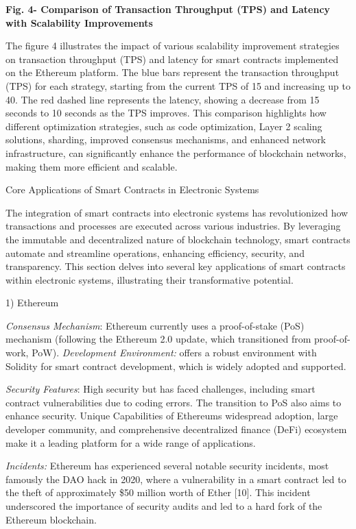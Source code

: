 \textbf{Fig. 4- Comparison of Transaction Throughput (TPS) and Latency
with Scalability Improvements}

The figure 4 illustrates the impact of various scalability improvement
strategies on transaction throughput (TPS) and latency for smart
contracts implemented on the Ethereum platform. The blue bars represent
the transaction throughput (TPS) for each strategy, starting from the
current TPS of 15 and increasing up to 40. The red dashed line
represents the latency, showing a decrease from 15 seconds to 10 seconds
as the TPS improves. This comparison highlights how different
optimization strategies, such as code optimization, Layer 2 scaling
solutions, sharding, improved consensus mechanisms, and enhanced network
infrastructure, can significantly enhance the performance of blockchain
networks, making them more efficient and scalable.

Core Applications of Smart Contracts in Electronic Systems

The integration of smart contracts into electronic systems has
revolutionized how transactions and processes are executed across
various industries. By leveraging the immutable and decentralized nature
of blockchain technology, smart contracts automate and streamline
operations, enhancing efficiency, security, and transparency. This
section delves into several key applications of smart contracts within
electronic systems, illustrating their transformative potential.

1) Ethereum

\emph{Consensus Mechanism}: Ethereum currently uses a proof-of-stake
(PoS) mechanism (following the Ethereum 2.0 update, which transitioned
from proof-of-work, PoW). \emph{Development Environment:} offers a
robust environment with Solidity for smart contract development, which
is widely adopted and supported.

\emph{Security Features}: High security but has faced challenges,
including smart contract vulnerabilities due to coding errors. The
transition to PoS also aims to enhance security. Unique Capabilities of
Ethereum\textquotesingle s widespread adoption, large developer
community, and comprehensive decentralized finance (DeFi) ecosystem make
it a leading platform for a wide range of applications.

\emph{Incidents:} Ethereum has experienced several notable security
incidents, most famously the DAO hack in 2020, where a vulnerability in
a smart contract led to the theft of approximately \$50 million worth of
Ether {[}10{]}. This incident underscored the importance of security
audits and led to a hard fork of the Ethereum blockchain.

